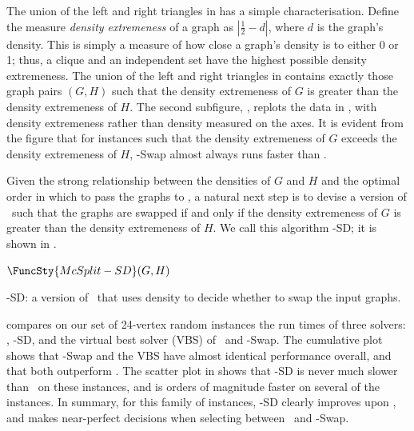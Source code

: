 The union of the left and right triangles in
 has a simple characterisation.
Define the measure \emph{density extremeness} of
a graph as $\left|\frac{1}{2} - d\right|$, where $d$ is the graph's
density.  This is simply a measure of how close a graph's
density is to either 0 or 1; thus, a clique and an independent set
have the highest possible density extremeness.  The union of the left and right triangles
in  contains exactly those
graph pairs $(G,H)$ such that the density extremeness of $G$ is greater than
the density extremeness of $H$.
The second subfigure, ,
replots the data in ,
with density extremeness rather than density measured on the axes.
It is evident from the figure that for instances such that the density extremeness of $G$
exceeds the density extremeness of $H$, \McSplit-Swap almost always
runs faster than \McSplit.

Given the strong relationship between the densities of $G$ and $H$ and the 
optimal order in which to pass the graphs to \McSplit, a natural next
step is to devise a version of \McSplit\ such that the graphs are
swapped if and only if the density extremeness of $G$ is greater
than the density extremeness of $H$.  We call this algorithm
\McSplit-SD; it is shown in .

\begin{algorithm}[h!]
\DontPrintSemicolon
\nl $\FuncSty{McSplit-SD}(G, H)$ \label{McSplitSDFun} \;
\nl {}
    \caption{\McSplit-SD: a version of \McSplit\ that uses density to decide whether to swap the input graphs.} 
\label{McSplitSDAlg}
\end{algorithm}

 compares on our set of 24-vertex random instances
the run times of three solvers: \McSplit, \McSplit-SD, and the virtual best solver (VBS) of
\McSplit\ and \McSplit-Swap.  The cumulative plot shows that \McSplit-Swap and the VBS
have almost identical performance overall, and that both outperform \McSplit.  The scatter
plot in  shows that \McSplit-SD is never much slower than
\McSplit\ on these instances, and is orders of magnitude faster on several of the
instances.  In summary, for this family of instances, \McSplit-SD clearly improves upon
\McSplit, and makes near-perfect decisions when selecting between \McSplit\ and \McSplit-Swap.

